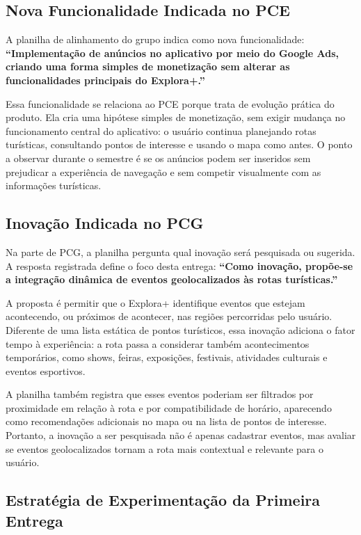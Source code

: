 \documentclass[12pt, a4paper]{article}
\begin{document}
\subsection{Nova Funcionalidade Indicada no PCE}

A planilha de alinhamento do grupo indica como nova funcionalidade: \textbf{``Implementa\c{c}\~ao de an\'uncios no aplicativo por meio do Google Ads, criando uma forma simples de monetiza\c{c}\~ao sem alterar as funcionalidades principais do Explora+.''}

Essa funcionalidade se relaciona ao PCE porque trata de evolu\c{c}\~ao pr\'atica do produto. Ela cria uma hip\'otese simples de monetiza\c{c}\~ao, sem exigir mudan\c{c}a no funcionamento central do aplicativo: o usu\'ario continua planejando rotas tur\'isticas, consultando pontos de interesse e usando o mapa como antes. O ponto a observar durante o semestre \'e se os an\'uncios podem ser inseridos sem prejudicar a experi\^encia de navega\c{c}\~ao e sem competir visualmente com as informa\c{c}\~oes tur\'isticas.

\subsection{Inova\c{c}\~ao Indicada no PCG}

Na parte de PCG, a planilha pergunta qual inova\c{c}\~ao ser\'a pesquisada ou sugerida. A resposta registrada define o foco desta entrega: \textbf{``Como inova\c{c}\~ao, prop\~oe-se a integra\c{c}\~ao din\^amica de eventos geolocalizados \`as rotas tur\'isticas.''}

A proposta \'e permitir que o Explora+ identifique eventos que estejam acontecendo, ou pr\'oximos de acontecer, nas regi\~oes percorridas pelo usu\'ario. Diferente de uma lista est\'atica de pontos tur\'isticos, essa inova\c{c}\~ao adiciona o fator tempo \`a experi\^encia: a rota passa a considerar tamb\'em acontecimentos tempor\'arios, como shows, feiras, exposi\c{c}\~oes, festivais, atividades culturais e eventos esportivos.

A planilha tamb\'em registra que esses eventos poderiam ser filtrados por proximidade em rela\c{c}\~ao \`a rota e por compatibilidade de hor\'ario, aparecendo como recomenda\c{c}\~oes adicionais no mapa ou na lista de pontos de interesse. Portanto, a inova\c{c}\~ao a ser pesquisada n\~ao \'e apenas cadastrar eventos, mas avaliar se eventos geolocalizados tornam a rota mais contextual e relevante para o usu\'ario.

\subsection{Estrat\'egia de Experimenta\c{c}\~ao da Primeira Entrega}
\end{document}
